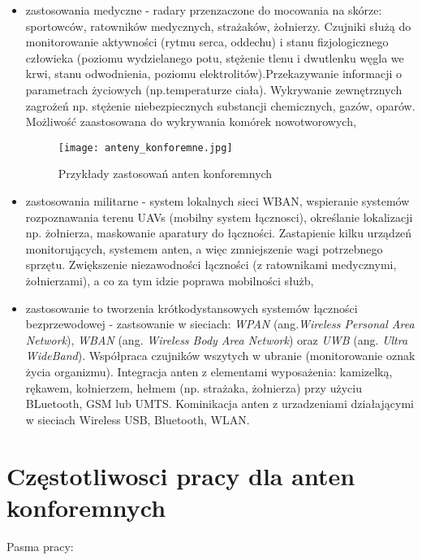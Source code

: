 \begin{itemize}\setlength{\itemsep}{0pt}
	
	\item zastosowania medyczne - radary przenzaczone do mocowania na skórze: sportowców, ratowników medycznych, strażaków, żołnierzy. Czujniki służą do monitorowanie aktywności (rytmu serca, oddechu) i stanu fizjologicznego człowieka (poziomu wydzielanego potu, stężenie tlenu i dwutlenku węgla we krwi, stanu odwodnienia, poziomu elektrolitów).Przekazywanie informacji o parametrach życiowych (np.temperaturze ciała). Wykrywanie zewnętrznych zagrożeń np. stężenie niebezpiecznych substancji chemicznych, gazów, oparów. Możliwość zaastosowana do wykrywania komórek nowotworowych,  

\begin{figure}[h!]
\centering
	\texttt{[image: anteny\_konforemne.jpg]}
	\caption{Przykłady zastosowań anten konforemnych}
\end{figure}

	\item zastosowania militarne - system lokalnych sieci WBAN, wspieranie systemów rozpoznawania terenu UAVs (mobilny system łącznosci), określanie lokalizacji np. żołnierza, maskowanie aparatury do łączności.
	Zastapienie kilku urządzeń monitorujących, systemem anten, a więc zmniejszenie wagi potrzebnego sprzętu. Zwiększenie niezawodności łączności (z ratownikami medycznymi, żołnierzami), a co za tym idzie poprawa mobilności służb,      

	\item zastosowanie to tworzenia krótkodystansowych systemów łączności bezprzewodowej - zastsowanie w sieciach: \emph{WPAN} (ang.\emph{Wireless Personal Area Network}), \emph{WBAN} (ang. \emph{Wireless Body Area Network}) oraz \emph{UWB} (ang. \emph{Ultra WideBand}). Współpraca czujników wszytych w ubranie (monitorowanie oznak życia organizmu). Integracja anten z elementami wyposażenia: kamizelką, rękawem, kołnierzem, hełmem (np. strażaka, żołnierza) przy użyciu BLuetooth, GSM lub UMTS. Kominikacja anten z urzadzeniami działającymi w sieciach Wireless USB, Bluetooth, WLAN.  

\end{itemize}
	

\section{Częstotliwosci pracy dla anten konforemnych}
 
\noindent Pasma pracy:

